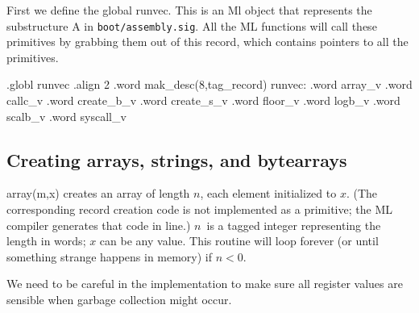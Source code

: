 First we define the global \code{}runvec\edoc{}.
This is an Ml object that represents the substructure \code{}A\edoc{} in 
{\tt boot/assembly.sig}.
All the ML functions will call these primitives by grabbing them
out of this record, which contains pointers to all the primitives.
\enddocs
{}
\endmoddef

        .globl  runvec
        .align  2
        .word   mak_desc(8,tag_record)
runvec:
        .word   array_v
        .word   callc_v
        .word   create_b_v
        .word   create_s_v
        .word   floor_v
        .word   logb_v
        .word   scalb_v
        .word   syscall_v

\endcode
{}
\subsection{Creating arrays, strings, and bytearrays}
\code{}array(m,x)\edoc{} creates an array of length $n$, each element initialized
to $x$.
(The corresponding record creation code is not implemented as a primitive; 
the ML compiler generates that code in line.)
$n$~is a tagged integer representing the length in words; 
$x$ can be any value.
This routine will loop forever (or until something strange happens
in memory) if $n<0$.

We need to be careful in the implementation to make sure all register values 
are sensible when garbage collection might occur.

